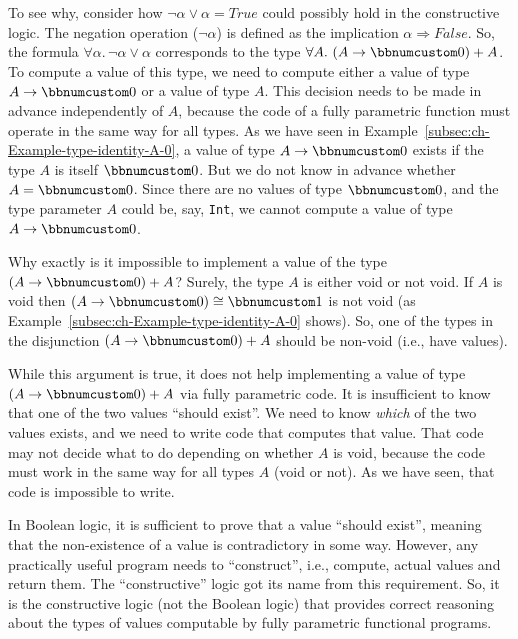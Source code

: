 To see why, consider how $\neg\alpha\vee\alpha=True$ could possibly
hold in the constructive logic. The negation operation ($\neg\alpha$)
is defined as the implication $\alpha\Rightarrow False$. So, the
formula $\forall\alpha.\,\neg\alpha\vee\alpha$ corresponds to the
type $\forall A.\,\left(A\rightarrow\bbnum 0\right)+A$. To compute
a value of this type, we need to compute either a value of type $A\rightarrow\bbnum 0$
or a value of type $A$. This decision needs to be made in advance
independently of $A$, because the code of a fully parametric function
must operate in the same way for all types. As we have seen in Example~\ref{subsec:ch-Example-type-identity-A-0},
a value of type $A\rightarrow\bbnum 0$ exists if the type $A$ is
itself $\bbnum 0$. But we do not know in advance whether $A=\bbnum 0$.
Since there are no values of type $\bbnum 0$, and the type parameter
$A$ could be, say, \lstinline!Int!, we cannot compute a value of
type $A\rightarrow\bbnum 0$.

Why exactly is it impossible to implement a value of the type $\left(A\rightarrow\bbnum 0\right)+A$?
Surely, the type $A$ is either void or not void. If $A$ is void
then $\left(A\rightarrow\bbnum 0\right)\cong\bbnum 1$ is not void
(as Example~\ref{subsec:ch-Example-type-identity-A-0} shows). So,
one of the types in the disjunction $\left(A\rightarrow\bbnum 0\right)+A$
should be non-void (i.e., have values).

While this argument is true, it does not help implementing a value
of type $\left(A\rightarrow\bbnum 0\right)+A$ via fully parametric
code. It is insufficient to know that one of the two values \textsf{``}should
exist\textsf{''}. We need to know \emph{which} of the two values exists, and
we need to write code that computes that value. That code may not
decide what to do depending on whether $A$ is void, because the code
must work in the same way for all types $A$ (void or not). As we
have seen, that code is impossible to write.

In Boolean logic, it is sufficient to prove that a value \textsf{``}should
exist\textsf{''}, meaning that the non-existence of a value is contradictory
in some way. However, any practically useful program needs to \textsf{``}construct\textsf{''},
i.e., compute, actual values and return them. The \textsf{``}constructive\textsf{''}
logic got its name from this requirement. So, it is the constructive
logic (not the Boolean logic) that provides correct reasoning about
the types of values computable by fully parametric functional programs.

